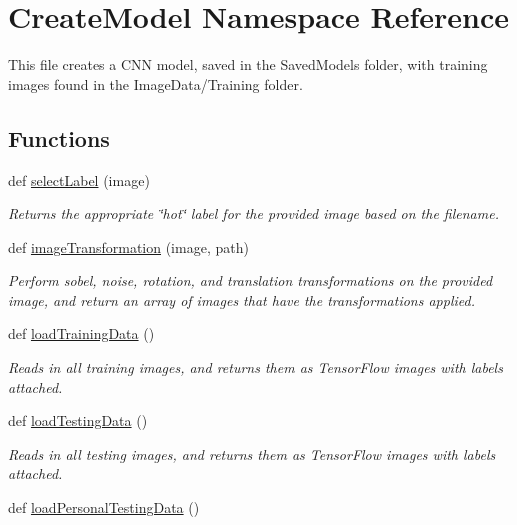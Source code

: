 \hypertarget{namespaceCreateModel}{}\section{Create\+Model Namespace Reference}
\label{namespaceCreateModel}


This file creates a C\+NN model, saved in the Saved\+Models folder, with training images found in the Image\+Data/\+Training folder.  


\subsection*{Functions}
\begin{DoxyCompactItemize}
\item 
def \hyperlink{namespaceCreateModel_afc24d24604298f3a50faeeca6c6a1671}{select\+Label} (image)
\begin{DoxyCompactList}\small\item\em Returns the appropriate \char`\"{}hot\char`\"{} label for the provided image based on the filename. \end{DoxyCompactList}\item 
def \hyperlink{namespaceCreateModel_afbe2ef216c8769c9300c48038330bdce}{image\+Transformation} (image, path)
\begin{DoxyCompactList}\small\item\em Perform sobel, noise, rotation, and translation transformations on the provided image, and return an array of images that have the transformations applied. \end{DoxyCompactList}\item 
def \hyperlink{namespaceCreateModel_a13d98b7ab2f39bdfb831e2f87a299c7e}{load\+Training\+Data} ()
\begin{DoxyCompactList}\small\item\em Reads in all training images, and returns them as Tensor\+Flow images with labels attached. \end{DoxyCompactList}\item 
def \hyperlink{namespaceCreateModel_a6d6154f59653471f7fc359cca6daabff}{load\+Testing\+Data} ()
\begin{DoxyCompactList}\small\item\em Reads in all testing images, and returns them as Tensor\+Flow images with labels attached. \end{DoxyCompactList}\item 
def \hyperlink{namespaceCreateModel_a6b6cb30f9a38350655c81bf380898084}{load\+Personal\+Testing\+Data} ()

\end{DoxyCompactItemize}
